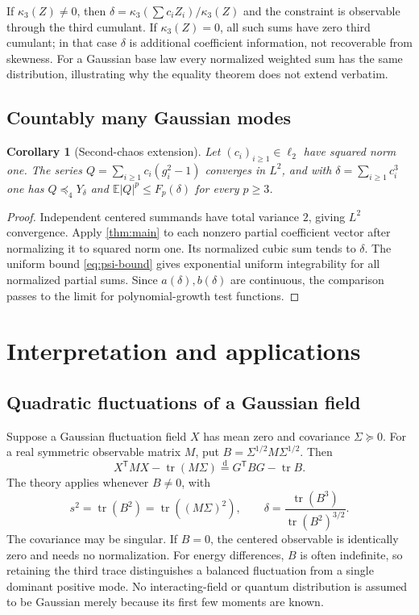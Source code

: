 \documentclass[11pt]{article}
\numberwithin{equation}{section}
\newtheorem{corollary}[theorem]{Corollary}
\theoremstyle{definition}
\theoremstyle{remark}
\newcommand{\E}{\mathbb E}
\newcommand{\tr}{\operatorname{tr}}
\newcommand{\eqd}{\overset{\mathrm d}=}
\begin{document}
If $\kappa_3(Z)\ne0$, then $\delta=\kappa_3(\sum c_iZ_i)/\kappa_3(Z)$ and the constraint is observable through the third cumulant. If $\kappa_3(Z)=0$, all such sums have zero third cumulant; in that case $\delta$ is additional coefficient information, not recoverable from skewness. For a Gaussian base law every normalized weighted sum has the same distribution, illustrating why the equality theorem does not extend verbatim.

\subsection{Countably many Gaussian modes}
\begin{corollary}[Second-chaos extension]\label{cor:infinite}
Let $(c_i)_{i\geq1}\in\ell_2$ have squared norm one. The series
$Q=\sum_{i\geq1}c_i(g_i^2-1)$ converges in $L^2$, and with
$\delta=\sum_{i\geq1}c_i^3$ one has $Q\preceq_4Y_\delta$ and
$\E|Q|^p\leq F_p(\delta)$ for every $p\geq3$.
\end{corollary}
\begin{proof}
Independent centered summands have total variance $2$, giving $L^2$ convergence. Apply \cref{thm:main} to each nonzero partial coefficient vector after normalizing it to squared norm one. Its normalized cubic sum tends to $\delta$. The uniform bound \eqref{eq:psi-bound} gives exponential uniform integrability for all normalized partial sums. Since $a(\delta),b(\delta)$ are continuous, the comparison passes to the limit for polynomial-growth test functions.
\end{proof}

\section{Interpretation and applications}
\label{sec:applications}

\subsection{Quadratic fluctuations of a Gaussian field}
Suppose a Gaussian fluctuation field $X$ has mean zero and covariance $\Sigma\succeq0$. For a real symmetric observable matrix $M$, put
$B=\Sigma^{1/2}M\Sigma^{1/2}$. Then
\[
X^{\mathsf T}MX-\tr(M\Sigma)\eqd G^{\mathsf T}BG-\tr B.
\]
The theory applies whenever $B\ne0$, with
\[
s^2=\tr(B^2)=\tr((M\Sigma)^2),\qquad
\delta=\frac{\tr(B^3)}{\tr(B^2)^{3/2}}.
\]
The covariance may be singular. If $B=0$, the centered observable is identically zero and needs no normalization. For energy differences, $B$ is often indefinite, so retaining the third trace distinguishes a balanced fluctuation from a single dominant positive mode. No interacting-field or quantum distribution is assumed to be Gaussian merely because its first few moments are known.
\end{document}

